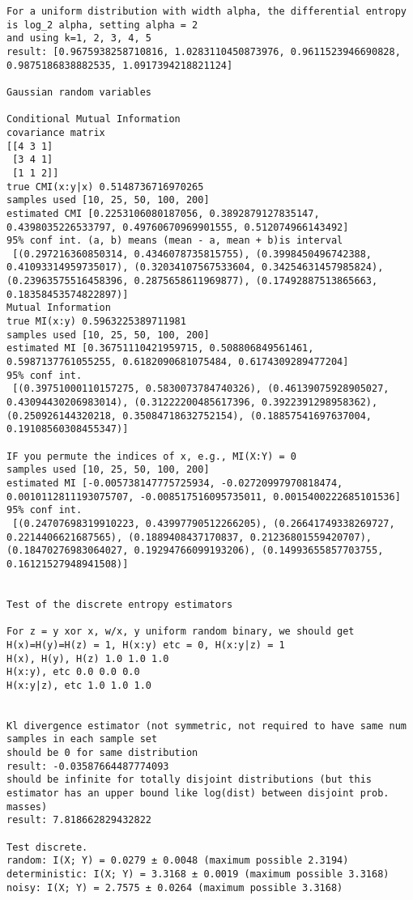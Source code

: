 \documentclass[12pt,a4paper]{report} %
\theoremstyle{definition}
\begin{document}
\begin{lstlisting}
For a uniform distribution with width alpha, the differential entropy is log_2 alpha, setting alpha = 2
and using k=1, 2, 3, 4, 5
result: [0.9675938258710816, 1.0283110450873976, 0.9611523946690828, 0.9875186838882535, 1.0917394218821124]

Gaussian random variables

Conditional Mutual Information
covariance matrix
[[4 3 1]
 [3 4 1]
 [1 1 2]]
true CMI(x:y|x) 0.5148736716970265
samples used [10, 25, 50, 100, 200]
estimated CMI [0.2253106080187056, 0.3892879127835147, 0.4398035226533797, 0.49760670969901555, 0.512074966143492]
95% conf int. (a, b) means (mean - a, mean + b)is interval
 [(0.297216360850314, 0.4346078735815755), (0.3998450496742388, 0.41093314959735017), (0.32034107567533604, 0.34254631457985824), (0.23963575516458396, 0.2875658611969877), (0.17492887513865663, 0.18358453574822897)]
Mutual Information
true MI(x:y) 0.5963225389711981
samples used [10, 25, 50, 100, 200]
estimated MI [0.36751110421959715, 0.508806849561461, 0.5987137761055255, 0.6182090681075484, 0.6174309289477204]
95% conf int.
 [(0.39751000110157275, 0.5830073784740326), (0.46139075928905027, 0.43094430206983014), (0.31222200485617396, 0.3922391298958362), (0.250926144320218, 0.35084718632752154), (0.18857541697637004, 0.19108560308455347)]

IF you permute the indices of x, e.g., MI(X:Y) = 0
samples used [10, 25, 50, 100, 200]
estimated MI [-0.005738147775725934, -0.02720997970818474, 0.0010112811193075707, -0.008517516095735011, 0.0015400222685101536]
95% conf int.
 [(0.24707698319910223, 0.43997790512266205), (0.26641749338269727, 0.2214406621687565), (0.1889408437170837, 0.21236801559420707), (0.18470276983064027, 0.19294766099193206), (0.14993655857703755, 0.16121527948941508)]


Test of the discrete entropy estimators

For z = y xor x, w/x, y uniform random binary, we should get H(x)=H(y)=H(z) = 1, H(x:y) etc = 0, H(x:y|z) = 1
H(x), H(y), H(z) 1.0 1.0 1.0
H(x:y), etc 0.0 0.0 0.0
H(x:y|z), etc 1.0 1.0 1.0


Kl divergence estimator (not symmetric, not required to have same num samples in each sample set
should be 0 for same distribution
result: -0.03587664487774093
should be infinite for totally disjoint distributions (but this estimator has an upper bound like log(dist) between disjoint prob. masses)
result: 7.818662829432822

Test discrete.
random: I(X; Y) = 0.0279 ± 0.0048 (maximum possible 2.3194)
deterministic: I(X; Y) = 3.3168 ± 0.0019 (maximum possible 3.3168)
noisy: I(X; Y) = 2.7575 ± 0.0264 (maximum possible 3.3168)
\end{lstlisting}
\end{document}
